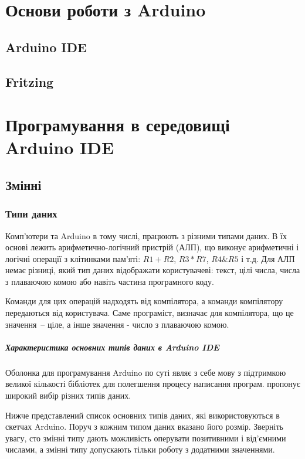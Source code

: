 \documentclass[12pt,a4paper]{report}  %
\begin{document}
\chapter{Основи роботи з Arduino}

\section{Arduino IDE}

\section{Fritzing}

\chapter{Програмування в середовищі\\Arduino IDE}

\section{Змінні}

\subsection{Типи даних}

Комп'ютери та Arduino в тому числі, працюють з різними типами даних. В їх основі лежить арифметично-логічний пристрій (АЛП), що виконує арифметичні і логічні операції з клітинками пам'яті: $R1 + R2$, $R3 * R7$, $R4 \& R5$ і т.д. Для АЛП немає різниці, який тип даних відображати користувачеві: текст, цілі числа, числа з плаваючою комою або навіть частина програмного коду.

Команди для цих операцій надходять від компілятора, а команди компілятору передаються від користувача. Саме програміст, визначає для компілятора, що це значення~-- ціле, а інше значення - число з плаваючою комою.

\paragraph{Характеристика основних типів даних в Arduino IDE}

Оболонка для програмування Arduino по суті являє з себе мову  з підтримкою великої кількості бібліотек для полегшення процесу написання програм.  пропонує широкий вибір різних типів даних.

Нижче представлений список основних типів даних, які використовуються в скетчах Arduino. Поруч з кожним типом даних вказано його розмір. Зверніть увагу, сто змінні типу  дають можливість оперувати позитивними і від'ємними числами, а змінні типу  допускають тільки роботу з додатними значеннями.
\end{document}
